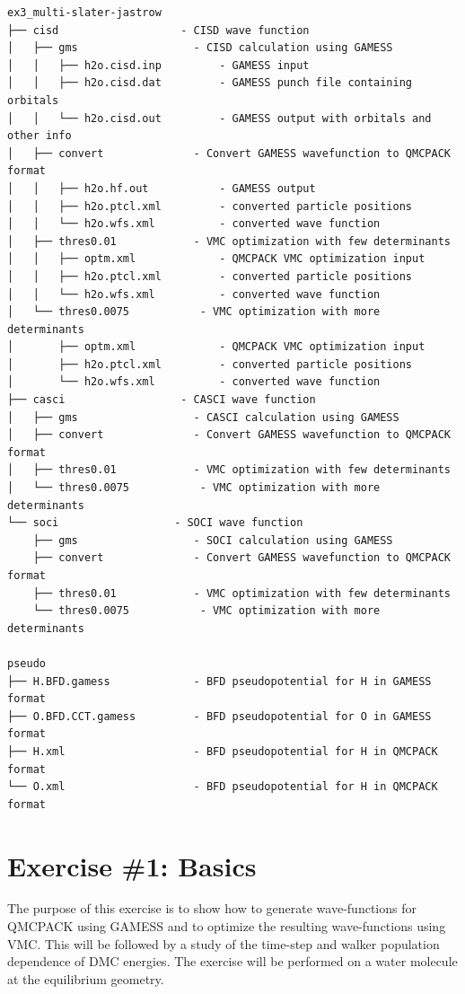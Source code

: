 \begin{shaded}
\begin{verbatim}
ex3_multi-slater-jastrow
├── cisd                   - CISD wave function
│   ├── gms                  - CISD calculation using GAMESS
│   │   ├── h2o.cisd.inp         - GAMESS input
│   │   ├── h2o.cisd.dat         - GAMESS punch file containing orbitals
│   │   └── h2o.cisd.out         - GAMESS output with orbitals and other info
│   ├── convert              - Convert GAMESS wavefunction to QMCPACK format
│   │   ├── h2o.hf.out           - GAMESS output
│   │   ├── h2o.ptcl.xml         - converted particle positions
│   │   └── h2o.wfs.xml          - converted wave function
│   ├── thres0.01            - VMC optimization with few determinants
│   │   ├── optm.xml             - QMCPACK VMC optimization input
│   │   ├── h2o.ptcl.xml         - converted particle positions
│   │   └── h2o.wfs.xml          - converted wave function 
│   └── thres0.0075           - VMC optimization with more determinants
│       ├── optm.xml             - QMCPACK VMC optimization input
│       ├── h2o.ptcl.xml         - converted particle positions
│       └── h2o.wfs.xml          - converted wave function 
├── casci                  - CASCI wave function
│   ├── gms                  - CASCI calculation using GAMESS
│   ├── convert              - Convert GAMESS wavefunction to QMCPACK format
│   ├── thres0.01            - VMC optimization with few determinants
│   └── thres0.0075           - VMC optimization with more determinants
└── soci                  - SOCI wave function
    ├── gms                  - SOCI calculation using GAMESS
    ├── convert              - Convert GAMESS wavefunction to QMCPACK format
    ├── thres0.01            - VMC optimization with few determinants
    └── thres0.0075           - VMC optimization with more determinants

pseudo
├── H.BFD.gamess             - BFD pseudopotential for H in GAMESS format
├── O.BFD.CCT.gamess         - BFD pseudopotential for O in GAMESS format
├── H.xml                    - BFD pseudopotential for H in QMCPACK format
└── O.xml                    - BFD pseudopotential for H in QMCPACK format
\end{verbatim}
\end{shaded}


\section{Exercise \#1: Basics}

The purpose of this exercise is to show how to generate wave-functions for QMCPACK
using GAMESS and to optimize the resulting wave-functions using VMC. This will be
followed by a study of the time-step and walker population dependence of DMC energies.
The exercise will be performed on a water molecule at the equilibrium geometry.


